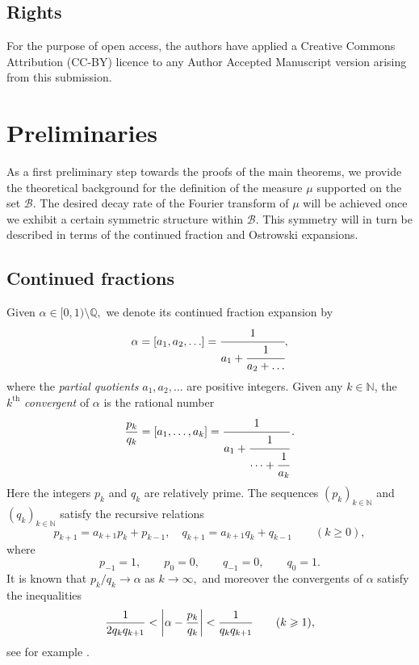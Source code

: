 \documentclass[12pt, reqno]{amsart}
\theoremstyle{definition}
\theoremstyle{remark}
\numberwithin{equation}{section}
\def\alp{{\alpha}} \def\bfalp{{\boldsymbol \alpha}}
\def \bN {\mathbb N}
\def \bQ {\mathbb Q}
\def \cB {\mathcal B}
\begin{document}
	\subsection*{Rights} 
	For the purpose of open access, the authors have applied a Creative Commons Attribution (CC-BY) licence to any Author Accepted Manuscript version arising from this submission.
	
	\section{Preliminaries}
	\label{prelims}
	
	As a first preliminary step towards the proofs of the main theorems, we provide the theoretical background for the definition of the measure $\mu$ supported on the set $\cB.$ The desired decay rate of the Fourier transform of $\mu$ will be achieved once we exhibit a certain symmetric structure within $\cB.$ This symmetry will in turn be described in terms of the continued fraction and Ostrowski expansions. 
	
	\subsection{Continued fractions} 
	Given $\alpha\in [0,1) \setminus \bQ,$ we denote its continued fraction expansion by 
	\[
	\alpha = [a_1, a_2, \ldots] = \cfrac{1}{a_1 + \cfrac{1}{a_2 + \dots }}, 
	\]
	where the {\it partial quotients} $a_1, a_2, \ldots$ are positive integers. Given any $k \in \bN$, the $k^{\mathrm{th}}$ \emph{convergent} of $\alpha$ is the rational number
	\[ 
	\frac{p_k}{q_k} = [a_1,\ldots, a_k] = \cfrac{1}{a_1 + \cfrac{1}{ \dots + \cfrac{1}{a_k}}} \, .
	\]
	Here the integers $p_k$ and $q_k$ are relatively prime. The sequences $(p_k)_{k\in\bN}$ and $(q_k)_{k\in\bN}$ satisfy the recursive relations \begin{equation} \label{recursive} 
		p_{k+1} =
		a_{k+1}p_k + p_{k-1},
		\quad
		q_{k+1} =
		a_{k+1}q_k + q_{k-1}
		\qquad (k \ge 0),
	\end{equation}
	where 
	\[
	p_{-1}=1, 
	\qquad
	p_0 = 0, 
	\qquad
	q_{-1}=0,
	\qquad
	q_0=1.
	\]
	It is known that   $p_k/q_k \to \alp$ as $k\to \infty,$ and moreover the convergents of $\alp$ satisfy the inequalities 
	\begin{equation} \label{rate}
		\frac{1}{2q_k q_{k+1}} < \left| \alp - \frac{p_k}{q_k}\right| < \frac{1}{q_k q_{k+1}} \qquad (k\gs 1), 
	\end{equation}
	see  for example  \cite[Chapter 7.5]{NZM1991}. 
	
\end{document}
